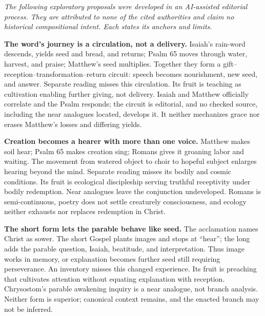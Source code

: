 \noindent\emph{The following exploratory proposals were developed in an AI-assisted editorial process. They are attributed to none of the cited authorities and claim no historical compositional intent. Each states its anchors and limits.}

\noindent\textbf{The word's journey is a circulation, not a delivery.\enspace{}}
Isaiah's rain-word descends, yields seed and bread, and returns; Psalm 65 moves through water, harvest, and praise; Matthew's seed multiplies. Together they form a gift--reception--transformation--return circuit: speech becomes nourishment, new seed, and answer. Separate reading misses this circulation. Its fruit is teaching as cultivation enabling further giving, not delivery. Isaiah and Matthew officially correlate and the Psalm responds; the circuit is editorial, and no checked source, including the near analogues located, develops it. It neither mechanizes grace nor erases Matthew's losses and differing yields.

\noindent\textbf{Creation becomes a hearer with more than one voice.\enspace{}}
Matthew makes soil hear; Psalm 65 makes creation sing; Romans gives it groaning labor and waiting. The movement from watered object to choir to hopeful subject enlarges hearing beyond the mind. Separate reading misses its bodily and cosmic conditions. Its fruit is ecological discipleship serving truthful receptivity under bodily redemption. Near analogues leave the conjunction undeveloped. Romans is semi-continuous, poetry does not settle creaturely consciousness, and ecology neither exhausts nor replaces redemption in Christ.

\noindent\textbf{The short form lets the parable behave like seed.\enspace{}}
The acclamation names Christ as sower. The short Gospel plants images and stops at “hear”; the long adds the parable question, Isaiah, beatitude, and interpretation. Thus image works in memory, or explanation becomes further seed still requiring perseverance. An inventory misses this changed experience. Its fruit is preaching that cultivates attention without equating explanation with reception. Chrysostom's parable awakening inquiry is a near analogue, not branch analysis. Neither form is superior; canonical context remains, and the enacted branch may not be inferred.

